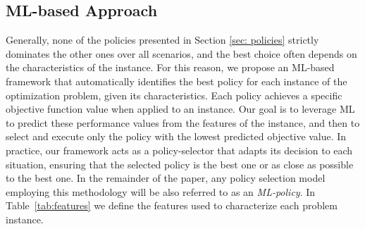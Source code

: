 \documentclass[preprint,11pt,authoryear]{elsarticle}
\begin{document}
\subsection{ML-based Approach}
Generally, none of the policies presented in Section \ref{sec: policies} strictly dominates the other ones over all scenarios, and the best choice often depends on the characteristics of the instance. For this reason, we propose an ML-based framework that automatically identifies the best policy for each instance of the optimization problem, given its characteristics. Each policy achieves a specific objective function value when applied to an instance. Our goal is to leverage ML to predict these performance values from the features of the instance, and then to select and execute only the policy with the lowest predicted objective value. In practice, our framework acts as a policy-selector that adapts its decision to each situation, ensuring that the selected policy is the best one or as close as possible to the best one. In the remainder of the paper, any policy selection model employing this methodology will be also referred to as an \textit{ML-policy}.
In Table~\ref{tab:features} we define the features used to characterize each problem instance.
\end{document}
